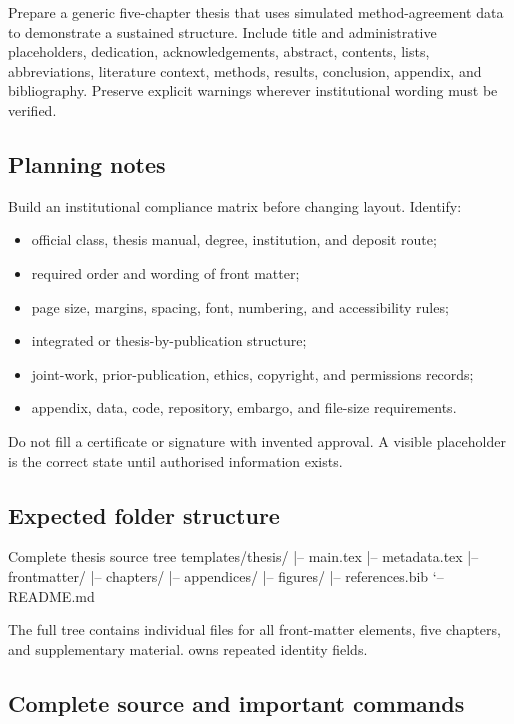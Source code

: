 Prepare a generic five-chapter thesis that uses simulated method-agreement data
to demonstrate a sustained structure. Include title and administrative
placeholders, dedication, acknowledgements, abstract, contents, lists,
abbreviations, literature context, methods, results, conclusion, appendix, and
bibliography. Preserve explicit warnings wherever institutional wording must be
verified.

\subsection{Planning notes}

Build an institutional compliance matrix before changing layout. Identify:

\begin{itemize}
  \item official class, thesis manual, degree, institution, and deposit route;
  \item required order and wording of front matter;
  \item page size, margins, spacing, font, numbering, and accessibility rules;
  \item integrated or thesis-by-publication structure;
  \item joint-work, prior-publication, ethics, copyright, and permissions records;
  \item appendix, data, code, repository, embargo, and file-size requirements.
\end{itemize}

Do not fill a certificate or signature with invented approval. A visible
placeholder is the correct state until authorised information exists.

\subsection{Expected folder structure}

\begin{terminalcode}{Complete thesis source tree}
templates/thesis/
|-- main.tex
|-- metadata.tex
|-- frontmatter/
|-- chapters/
|-- appendices/
|-- figures/
|-- references.bib
`-- README.md
\end{terminalcode}

The full tree contains individual files for all front-matter elements, five
chapters, and supplementary material.  owns repeated identity
fields.

\subsection{Complete source and important commands}

